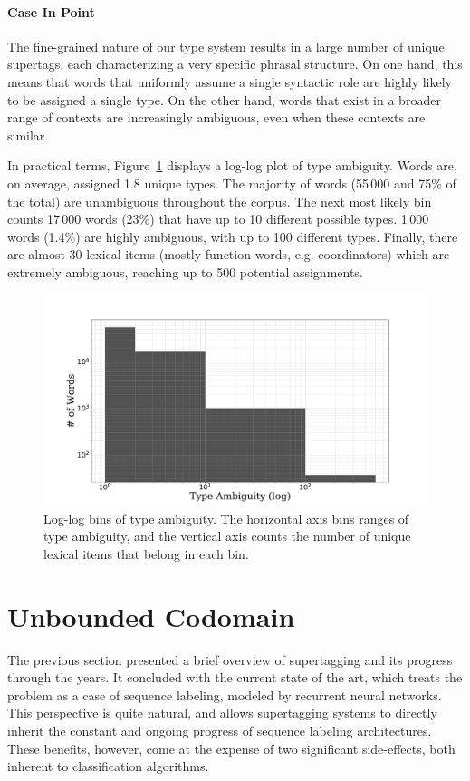 \paragraph{Case In Point}
The fine-grained nature of our type system results in a large number of unique supertags, each characterizing a very specific phrasal structure.
On one hand, this means that words that uniformly assume a single syntactic role are highly likely to be assigned a single type.
On the other hand, words that exist in a broader range of contexts are increasingly ambiguous, even when these contexts are similar.

In practical terms, Figure~\ref{fig:type_ambiguity} displays a log-log plot of type ambiguity. 
Words are, on average, assigned 1.8 unique types.
The majority of words (55\,000 and 75\% of the total) are unambiguous throughout the corpus.
The next most likely bin counts 17\,000 words (23\%) that have up to 10 different possible types. 
1\,000 words (1.4\%) are highly ambiguous, with up to 100 different types.
Finally, there are almost 30 lexical items (mostly function words, e.g. coordinators) which are extremely ambiguous, reaching up to 500 potential assignments.



\begin{figure}
    \centering
    \includegraphics[scale=0.29]{Figures/ambiguity.pdf}
    \caption[Extracted Type Ambiguity]{Log-log bins of type ambiguity. The horizontal axis bins ranges of type ambiguity, and the vertical axis counts the number of unique lexical items that belong in each bin.}
    \label{fig:type_ambiguity}
\end{figure}

\section{Unbounded Codomain}
The previous section presented a brief overview of supertagging and its progress through the years.
It concluded with the current state of the art, which treats the problem as a case of sequence labeling, modeled by recurrent neural networks.
This perspective is quite natural, and allows supertagging systems to directly inherit the constant and ongoing progress of sequence labeling architectures.
These benefits, however, come at the expense of two significant side-effects, both inherent to classification algorithms.


